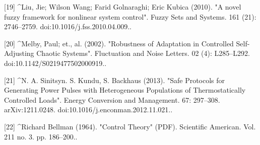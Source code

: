 [19]
^Liu, Jie; Wilson Wang; Farid Golnaraghi; Eric Kubica (2010). "A novel fuzzy framework for nonlinear system control". Fuzzy Sets and Systems. 161 (21): 2746–2759. doi:10.1016/j.fss.2010.04.009..

[20]
^Melby, Paul; et., al. (2002). "Robustness of Adaptation in Controlled Self-Adjusting Chaotic Systems". Fluctuation and Noise Letters. 02 (4): L285–L292. doi:10.1142/S0219477502000919..

[21]
^N. A. Sinitsyn. S. Kundu, S. Backhaus (2013). "Safe Protocols for Generating Power Pulses with Heterogeneous Populations of Thermostatically Controlled Loads". Energy Conversion and Management. 67: 297–308. arXiv:1211.0248. doi:10.1016/j.enconman.2012.11.021..

[22]
^Richard Bellman (1964). "Control Theory" (PDF). Scientific American. Vol. 211 no. 3. pp. 186–200..